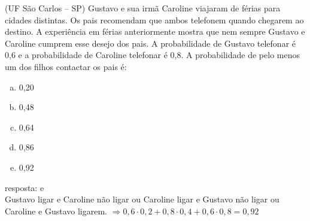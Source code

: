 \begin{ex}
(UF São Carlos – SP) Gustavo e sua irmã Caroline viajaram de férias para cidades distintas. Os pais recomendam que ambos telefonem quando chegarem ao destino. A experiência em férias anteriormente mostra que nem sempre Gustavo e Caroline cumprem esse desejo dos pais. A probabilidade de Gustavo telefonar é 0,6 e a probabilidade de Caroline telefonar é 0,8. A probabilidade de pelo menos um dos filhos contactar os pais é:
   \begin{enumerate}[(a)]
   \item 0,20
   \item 0,48
   \item 0,64
   \item 0,86
   \item 0,92
   \end{enumerate}
     \begin{sol}
       resposta: e \\
       Gustavo ligar e Caroline não ligar ou Caroline ligar e Gustavo não ligar ou Caroline e Gustavo ligarem. 
       $\Longrightarrow 0,6\cdot0,2+0,8\cdot0,4+0,6\cdot0,8=0,92$
     \end{sol}
\end{ex}